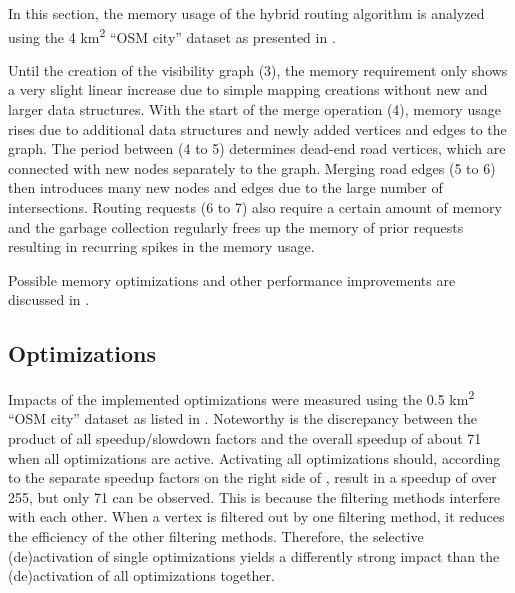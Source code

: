 		In this section, the memory usage of the hybrid routing algorithm is analyzed using the 4 km\textsuperscript{2} \enquote{OSM city} dataset as presented in .
		
		Until the creation of the visibility graph (3), the memory requirement only shows a very slight linear increase due to simple mapping creations without new and larger data structures.
		With the start of the merge operation (4), memory usage rises due to additional data structures and newly added vertices and edges to the graph.
		The period between (4 to 5) determines dead-end road vertices, which are connected with new nodes separately to the graph.
		Merging road edges (5 to 6) then introduces many new nodes and edges due to the large number of intersections.
		Routing requests (6 to 7) also require a certain amount of memory and the garbage collection regularly frees up the memory of prior requests resulting in recurring spikes in the memory usage.
		
		Possible memory optimizations and other performance improvements are discussed in .
		
	\subsection{Optimizations}
	
		Impacts of the implemented optimizations were measured using the 0.5 km\textsuperscript{2} \enquote{OSM city} dataset as listed in .
		Noteworthy is the discrepancy between the product of all speedup/slowdown factors and the overall speedup of about 71 when all optimizations are active.
		Activating all optimizations should, according to the separate speedup factors on the right side of , result in a speedup of over 255, but only 71 can be observed.
		This is because the filtering methods interfere with each other.
		When a vertex is filtered out by one filtering method, it reduces the efficiency of the other filtering methods.
		Therefore, the selective (de)activation of single optimizations yields a differently strong impact than the (de)activation of all optimizations together.
		
